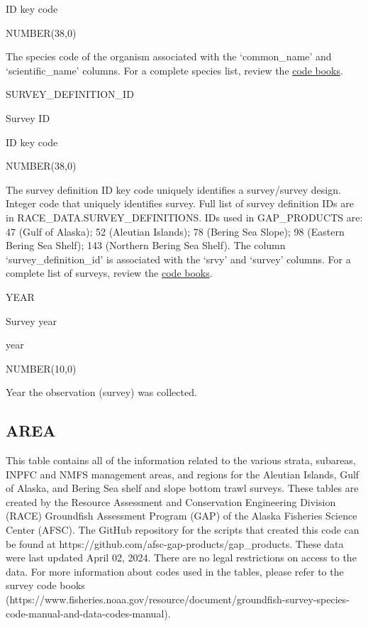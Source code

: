 \documentclass[
  letterpaper,
  oneside,
  open=any]{scrbook}
\begin{document}
ID key code

NUMBER(38,0)

The species code of the organism associated with the `common\_name' and
`scientific\_name' columns. For a complete species list, review the
\href{https://www.fisheries.noaa.gov/resource/document/groundfish-survey-species-code-manual-and-data-codes-manual}{code
books}.

SURVEY\_DEFINITION\_ID

Survey ID

ID key code

NUMBER(38,0)

The survey definition ID key code uniquely identifies a survey/survey
design. Integer code that uniquely identifies survey. Full list of
survey definition IDs are in RACE\_DATA.SURVEY\_DEFINITIONS. IDs used in
GAP\_PRODUCTS are: 47 (Gulf of Alaska); 52 (Aleutian Islands); 78
(Bering Sea Slope); 98 (Eastern Bering Sea Shelf); 143 (Northern Bering
Sea Shelf). The column `survey\_definition\_id' is associated with the
`srvy' and `survey' columns. For a complete list of surveys, review the
\href{https://www.fisheries.noaa.gov/resource/document/groundfish-survey-species-code-manual-and-data-codes-manual}{code
books}.

YEAR

Survey year

year

NUMBER(10,0)

Year the observation (survey) was collected.

\hypertarget{area}{%
\subsection{AREA}\label{area}}

This table contains all of the information related to the various
strata, subareas, INPFC and NMFS management areas, and regions for the
Aleutian Islands, Gulf of Alaska, and Bering Sea shelf and slope bottom
trawl surveys. These tables are created by the Resource Assessment and
Conservation Engineering Division (RACE) Groundfish Assessment Program
(GAP) of the Alaska Fisheries Science Center (AFSC). The GitHub
repository for the scripts that created this code can be found at
https://github.com/afsc-gap-products/gap\_products. These data were last
updated April 02, 2024. There are no legal restrictions on access to the
data. For more information about codes used in the tables, please refer
to the survey code books
(https://www.fisheries.noaa.gov/resource/document/groundfish-survey-species-code-manual-and-data-codes-manual).
\end{document}

